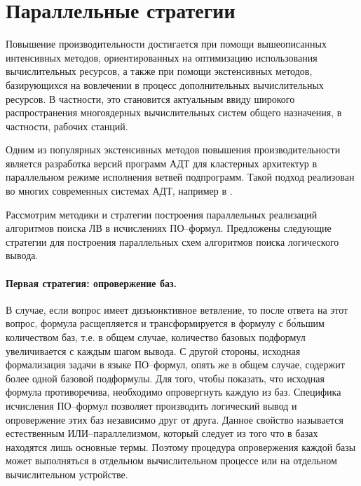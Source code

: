 \section{Параллельные стратегии}

Повышение производительности достигается при помощи вышеописанных интенсивных методов, ориентированных на оптимизацию использования вычислительных ресурсов, а также при помощи экстенсивных методов, базирующихся на вовлечении в процесс дополнительных вычислительных ресурсов. В частности, это становится актуальным ввиду широкого распространения многоядерных вычислительных систем общего назначения, в частности, рабочих станций.

Одним из популярных экстенсивных методов повышения производительности является разработка версий программ АДТ для кластерных архитектур в параллельном режиме исполнения ветвей подпрограмм. Такой подход реализован во многих современных системах АДТ, например в \cite{PSETHEO}.

Рассмотрим методики и стратегии построения параллельных реализаций алгоритмов поиска ЛВ в исчислениях ПО--формул. Предложены следующие стратегии для построения параллельных схем алгоритмов поиска логического вывода.

\paragraph{Первая стратегия: опровержение баз.}

В случае, если вопрос имеет дизъюнктивное ветвление, то после ответа на этот вопрос, формула расщепляется и трансформируется в формулу с б\'{о}льшим количеством баз, т.е. в общем случае, количество базовых подформул увеличивается с каждым шагом вывода. С другой стороны, исходная формализация задачи в языке ПО--формул, опять же в общем случае, содержит более одной базовой подформулы. Для того, чтобы показать, что исходная формула противоречива, необходимо опровергнуть каждую из баз. Специфика исчисления ПО--формул позволяет производить логический вывод и опровержение этих баз независимо друг от друга. Данное свойство называется естественным ИЛИ--параллелизмом, который следует из того что в базах находятся лишь основные термы. Поэтому процедура опровержения каждой базы может выполняться в отдельном вычислительном процессе или на отдельном вычислительном устройстве.

